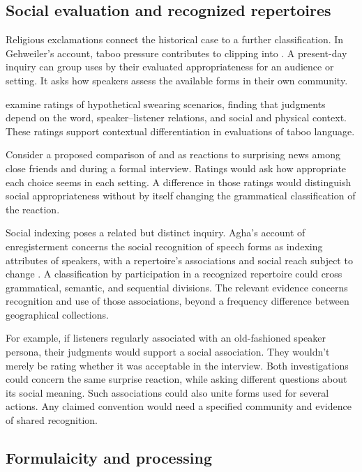\documentclass[12pt]{article}
\begin{document}
\subsection{Social evaluation and recognized repertoires}

Religious exclamations connect the historical case to a further classification.
In Gehweiler's account, taboo pressure contributes to clipping 
into . A present-day inquiry can group uses by their
evaluated appropriateness for an audience or setting. It asks how
speakers assess the available forms in their own community.

\textcite{jayjanschewitz2008} examine ratings of hypothetical swearing scenarios,
finding that judgments depend on the word, speaker--listener relations,
and social and physical context. These ratings support contextual
differentiation in evaluations of taboo language.

Consider a proposed comparison of  and 
as reactions to surprising news among close friends and during a
formal interview. Ratings would ask how appropriate each choice seems
in each setting. A difference in those ratings would distinguish
social appropriateness without by itself changing the grammatical classification
of the reaction.

Social indexing poses a related but distinct inquiry. Agha's account
of enregisterment concerns the social recognition of speech forms as
indexing attributes of speakers, with a repertoire's associations and
social reach subject to change \citep[38--40]{agha2005}. A classification
by participation in a recognized repertoire could cross grammatical,
semantic, and sequential divisions. The relevant evidence concerns
recognition and use of those associations, beyond a frequency difference
between geographical collections.

For example, if listeners regularly associated  with an
old-fashioned speaker persona, their judgments would support a social
association. They wouldn't merely be rating whether it was acceptable
in the interview. Both investigations could concern the same surprise
reaction, while asking different questions about its social meaning.
Such associations could also unite forms used for several actions.
Any claimed convention would need a specified community and evidence
of shared recognition.

\subsection{Formulaicity and processing}
\end{document}
